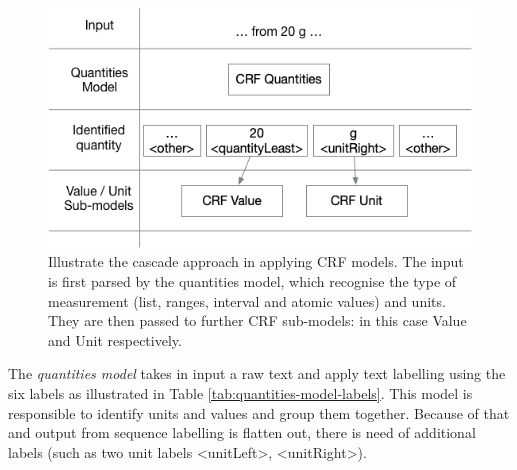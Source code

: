 \documentclass[sigconf]{acmart}
\begin{document}
\begin{figure}[h]
  \centering
  \includegraphics[width=\linewidth]{images/schema-cascade}
  \caption{Illustrate the cascade approach in applying CRF models. The input is first parsed by the quantities model, which recognise the type of measurement (list, ranges, interval and atomic values) and units. They are then passed to further CRF sub-models: in this case Value and Unit respectively.}
  \label{fig:schema-cascade}
\end{figure}


The \textit{quantities model} takes in input a raw text and apply text labelling using the six labels as illustrated in Table \ref{tab:quantities-model-labels}. This model is responsible to identify units and values and group them together. Because of that and  output from sequence labelling is flatten out, there is need of additional labels (such as two unit labels <unitLeft>, <unitRight>). 
\end{document}
